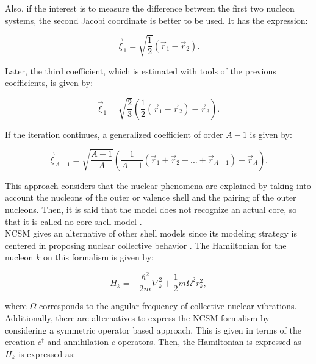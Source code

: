 \documentclass[openany]{book}
\begin{document}
Also, if the interest is to measure the difference between the first two nucleon systems, the second Jacobi coordinate is better to be used. It has the expression: 

\begin{equation}\label{eq:micro_NCSM_jacobi1}
	\vec \xi_1 = \sqrt{\frac{1}{2}} (\vec r_1 - \vec r_2).
\end{equation}

Later, the third coefficient, which is estimated with tools of the previous coefficients, is given by: 

\begin{equation}\label{eq:micro_NCSM_jacobi2}
	\vec \xi_1 = \sqrt{\frac{2}{3}} ( \frac{1}{2}(\vec r_1 - \vec r_2) - \vec r_3).
\end{equation}

If the iteration continues, a generalized coefficient of order $A - 1$ is given by: 

\begin{equation}\label{eq:micro_NCSM_jacobiA-1}
	\vec \xi_{A-1} = \sqrt{\frac{A-1}{A}} \left( \frac{1}{A-1}(\vec r_1 +  \vec r_2 + ... + \vec r_{A - 1}) - \vec r_A  \right).
\end{equation}

This approach considers that the nuclear phenomena are explained by taking into account the nucleons of the outer or valence shell and the pairing of the outer nucleons. Then, it is said that the model does not recognize an actual core, so that it is called no core shell model \cite{barrett_navratil_vary_2013}. \\


NCSM gives an alternative of other shell models since its modeling strategy is centered in proposing nuclear collective behavior \cite{freer_horiuchi_kanada-enyo_lee_meisner_2018}. The Hamiltonian for the nucleon $k$ on this formalism is given by: 

\begin{equation}\label{eq:micro_NCSM_Hamiltonian}
	H_k = -\frac{\hbar^2}{2m} \nabla^2_k + \frac{1}{2} m \Omega^2 r^2_k,
\end{equation}

where $\Omega$ corresponds to the angular frequency of collective nuclear vibrations. \\

Additionally, there are alternatives to express the NCSM formalism by considering a symmetric operator based approach. This is given in terms of the creation $c^{\dagger}$ and annihilation $c$ operators. Then, the Hamiltonian is expressed as $H_k$ is expressed as: 
\end{document}
